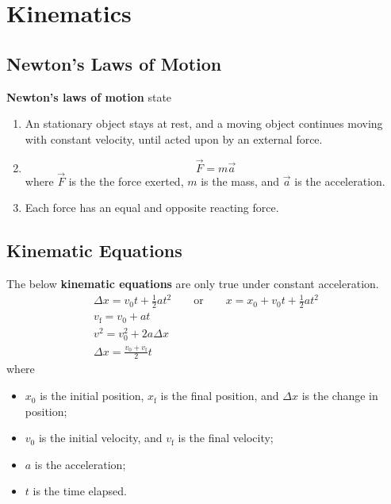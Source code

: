 \chapter{Kinematics}


\section{Newton's Laws of Motion}

\textbf{Newton's laws of motion} state
\begin{enumerate}
    \item \label{itm:newtons-1st-law}
        An stationary object stays at rest,
        and a moving object continues moving with constant velocity,
        until acted upon by an external force.
    \item
        \begin{equation} \label{eq:newtons-2nd-law}
            \vec{F} = m\vec{a}
        \end{equation}
        where \(\vec{F}\) is the the force exerted, \(m\) is the mass,
        and \(\vec{a}\) is the acceleration.
    \item \label{itm:newtons-3rd-law}
        Each force has an equal and opposite reacting force.
\end{enumerate}

\section{Kinematic Equations}

The below \textbf{kinematic equations} are only true under constant
acceleration.
\begin{subequations}
    \begin{gather} \label{eq:linear-kinematic}
        {
            \Delta{x} = v_0 t + \frac{1}{2} a t^2
            \qquad \mathrm{or} \qquad
            x = x_0 + v_0 t + \frac{1}{2} a t^2
        } \\
        v_\mathrm{f} = v_0 + a t \\
        v^2 = v_0^2 + 2 a \Delta{x} \\
        \Delta{x} = \frac{v_0 + v_\mathrm{f}}{2} t
    \end{gather}
\end{subequations}
where
\begin{itemize}
    \item \(x_0\) is the initial position,
        \(x_\mathrm{f}\) is the final position,
        and \(\Delta{x}\) is the change in position;
    \item \(v_0\) is the initial velocity,
        and \(v_\mathrm{f}\) is the final velocity;
    \item \(a\) is the acceleration;
    \item \(t\) is the time elapsed.
\end{itemize}
